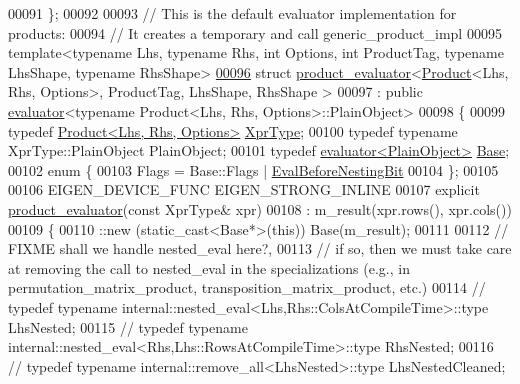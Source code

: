 \begin{DoxyCode}
00091 \};
00092 
00093 \textcolor{comment}{// This is the default evaluator implementation for products:}
00094 \textcolor{comment}{// It creates a temporary and call generic\_product\_impl}
00095 \textcolor{keyword}{template}<\textcolor{keyword}{typename} Lhs, \textcolor{keyword}{typename} Rhs, \textcolor{keywordtype}{int} Options, \textcolor{keywordtype}{int} ProductTag, \textcolor{keyword}{typename} LhsShape, \textcolor{keyword}{typename} RhsShape>
\hyperlink{struct_eigen_1_1internal_1_1product__evaluator_3_01_product_3_01_lhs_00_01_rhs_00_01_options_01_34fdf849c0cc96fc7f8fe25f34362e65}{00096} \textcolor{keyword}{struct }\hyperlink{struct_eigen_1_1internal_1_1product__evaluator}{product\_evaluator}<\hyperlink{group___core___module_class_eigen_1_1_product}{Product}<Lhs, Rhs, Options>, ProductTag, LhsShape, RhsShape
      >
00097   : \textcolor{keyword}{public} \hyperlink{struct_eigen_1_1internal_1_1evaluator}{evaluator}<typename Product<Lhs, Rhs, Options>::PlainObject>
00098 \{
00099   \textcolor{keyword}{typedef} \hyperlink{group___core___module_class_eigen_1_1_product}{Product<Lhs, Rhs, Options>} \hyperlink{group___core___module_class_eigen_1_1_product}{XprType};
00100   \textcolor{keyword}{typedef} \textcolor{keyword}{typename} XprType::PlainObject PlainObject;
00101   \textcolor{keyword}{typedef} \hyperlink{struct_eigen_1_1internal_1_1evaluator}{evaluator<PlainObject>} \hyperlink{struct_eigen_1_1internal_1_1evaluator}{Base};
00102   \textcolor{keyword}{enum} \{
00103     Flags = Base::Flags | \hyperlink{group__flags_gaa34e83bae46a8eeae4e69ebe3aaecbed}{EvalBeforeNestingBit}
00104   \};
00105 
00106   EIGEN\_DEVICE\_FUNC EIGEN\_STRONG\_INLINE
00107   \textcolor{keyword}{explicit} \hyperlink{struct_eigen_1_1internal_1_1product__evaluator}{product\_evaluator}(\textcolor{keyword}{const} XprType& xpr)
00108     : m\_result(xpr.rows(), xpr.cols())
00109   \{
00110     ::new (static\_cast<Base*>(\textcolor{keyword}{this})) Base(m\_result);
00111     
00112 \textcolor{comment}{// FIXME shall we handle nested\_eval here?,}
00113 \textcolor{comment}{// if so, then we must take care at removing the call to nested\_eval in the specializations (e.g., in
       permutation\_matrix\_product, transposition\_matrix\_product, etc.)}
00114 \textcolor{comment}{//     typedef typename internal::nested\_eval<Lhs,Rhs::ColsAtCompileTime>::type LhsNested;}
00115 \textcolor{comment}{//     typedef typename internal::nested\_eval<Rhs,Lhs::RowsAtCompileTime>::type RhsNested;}
00116 \textcolor{comment}{//     typedef typename internal::remove\_all<LhsNested>::type LhsNestedCleaned;}

\end{DoxyCode}
